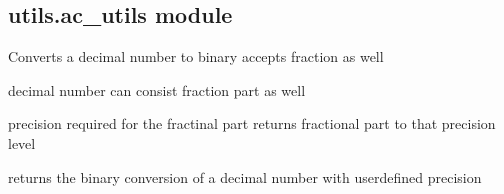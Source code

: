 \documentclass[letterpaper,10pt,english]{sphinxmanual}
\begin{document}
\subsection{utils.ac\_utils module}
\label{\detokenize{utils:module-utils.ac_utils}}\label{\detokenize{utils:utils-ac-utils-module}}

\begin{fulllineitems}
\label{\detokenize{utils:utils.ac_utils.decToBinConversion}}
\pysigstartsignatures
{}
\pysigstopsignatures
\sphinxAtStartPar
Converts a decimal number to binary accepts fraction as well
\begin{description}
\begin{description}
\sphinxAtStartPar
decimal number can consist fraction part as well

\sphinxAtStartPar
precision required for the fractinal part returns fractional part to that precision level

\end{description}

\begin{description}
\sphinxAtStartPar
returns the binary conversion of a decimal number with user\sphinxhyphen{}defined precision

\end{description}

\end{description}

\end{fulllineitems}

\end{document}

